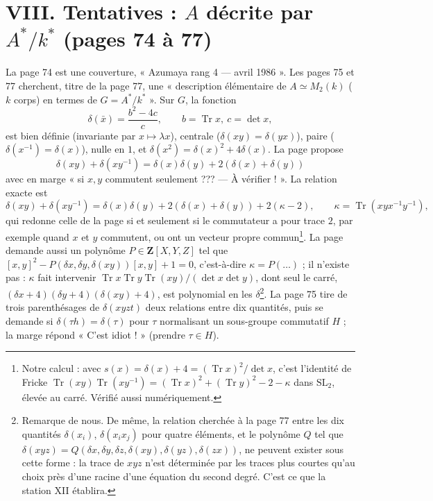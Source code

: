 \documentclass[11pt,a4paper]{article}
\begin{document}
\section*{VIII. Tentatives : $A$ décrite par $A^{*}/k^{*}$ (pages 74 à 77)}

La page 74 est une couverture, « Azumaya rang 4 — avril 1986 ». Les pages 75
et 77 cherchent, titre de la page 77, une « description élémentaire de $A \simeq
M_2(k)$ ($k$ corps) en termes de $G = A^{*}/k^{*}$ ». Sur $G$, la fonction
\[
  \delta(\bar x) = \frac{b^2 - 4c}{c},\qquad b = \operatorname{Tr}x,\ c = \det x,
\]
est bien définie (invariante par $x \mapsto \lambda x$), centrale
($\delta(xy) = \delta(yx)$), paire ($\delta(x^{-1}) = \delta(x)$), nulle en $1$,
et $\delta(x^2) = \delta(x)^2 + 4\delta(x)$. La page propose
\[
  \delta(xy) + \delta(xy^{-1}) = \delta(x)\delta(y) + 2(\delta(x) + \delta(y))
\]
avec en marge « si $x, y$ commutent seulement ??? — À vérifier ! ». La
relation exacte est
\[
  \delta(xy) + \delta(xy^{-1}) = \delta(x)\delta(y) + 2(\delta(x) + \delta(y)) +
  2(\kappa - 2),\qquad \kappa = \operatorname{Tr}(xyx^{-1}y^{-1}),
\]
qui redonne celle de la page si et seulement si le commutateur a pour trace
$2$, par exemple quand $x$ et $y$ commutent, ou ont un vecteur propre
commun\footnote{Notre calcul : avec $s(x) = \delta(x) + 4 =
(\operatorname{Tr}x)^2/\det x$, c'est l'identité de Fricke
$\operatorname{Tr}(xy)\operatorname{Tr}(xy^{-1}) = (\operatorname{Tr}x)^2 +
(\operatorname{Tr}y)^2 - 2 - \kappa$ dans $\mathrm{SL}_2$, élevée au carré. Vérifié
aussi numériquement.}. La page demande aussi un polynôme $P \in
\mathbf{Z}[X, Y, Z]$ tel que $[x, y]^2 - P(\delta x, \delta y, \delta(xy))[x, y] +
1 = 0$, c'est-à-dire $\kappa = P(\ldots)$ ; il n'existe pas : $\kappa$ fait
intervenir $\operatorname{Tr}x\operatorname{Tr}y\operatorname{Tr}(xy)/(\det x\det
y)$, dont seul le carré, $(\delta x + 4)(\delta y + 4)(\delta(xy) + 4)$, est
polynomial en les $\delta$\footnote{Remarque de nous. De même, la relation
cherchée à la page 77 entre les dix quantités $\delta(x_i)$, $\delta(x_ix_j)$
pour quatre éléments, et le polynôme $Q$ tel que $\delta(xyz) =
Q(\delta x, \delta y, \delta z, \delta(xy), \delta(yz), \delta(zx))$, ne peuvent
exister sous cette forme : la trace de $xyz$ n'est déterminée par les traces
plus courtes qu'au choix près d'une racine d'une équation du second degré.
C'est ce que la station XII établira.}. La page 75 tire de trois
parenthésages de $\delta(xyzt)$ deux relations entre dix quantités, puis se
demande si $\delta(\tau h) = \delta(\tau)$ pour $\tau$ normalisant un sous-groupe
commutatif $H$ ; la marge répond « C'est idiot ! » (prendre $\tau \in H$).
\end{document}
